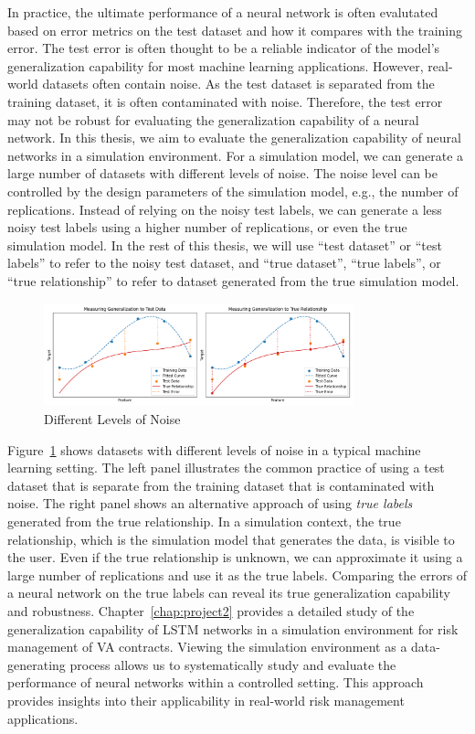 In practice, the ultimate performance of a neural network is often evalutated based on error metrics on the test dataset and how it compares with the training error. 
The test error is often thought to be a reliable indicator of the model's generalization capability for most machine learning applications.
However, real-world datasets often contain noise.
As the test dataset is separated from the training dataset, it is often contaminated with noise.
Therefore, the test error may not be robust for evaluating the generalization capability of a neural network.
In this thesis, we aim to evaluate the generalization capability of neural networks in a simulation environment.
For a simulation model, we can generate a large number of datasets with different levels of noise.
The noise level can be controlled by the design parameters of the simulation model, e.g., the number of replications.
Instead of relying on the noisy test labels, we can generate a less noisy test labels using a higher number of replications, or even the true simulation model.
In the rest of this thesis, we will use ``test dataset'' or ``test labels'' to refer to the noisy test dataset, and ``true dataset'', ``true labels'', or ``true relationship'' to refer to dataset generated from the true simulation model.

\begin{figure}[ht!] 
    \centering
    \includegraphics[width=0.8\textwidth]{./project2/figures/datasets.png}
    \caption{Different Levels of Noise}
    \label{fig:datasets}
\end{figure}

Figure~\ref{fig:datasets} shows datasets with different levels of noise in a typical machine learning setting.
The left panel illustrates the common practice of using a test dataset that is separate from the training dataset that is contaminated with noise.
The right panel shows an alternative approach of using \textit{true labels} generated from the true relationship.
In a simulation context, the true relationship, which is the simulation model that generates the data, is visible to the user.
Even if the true relationship is unknown, we can approximate it using a large number of replications and use it as the true labels.
Comparing the errors of a neural network on the true labels can reveal its true generalization capability and robustness.
Chapter~\ref{chap:project2} provides a detailed study of the generalization capability of LSTM networks in a simulation environment for risk management of VA contracts.
Viewing the simulation environment as a data-generating process allows us to systematically study and evaluate the performance of neural networks within a controlled setting.
This approach provides insights into their applicability in real-world risk management applications.

